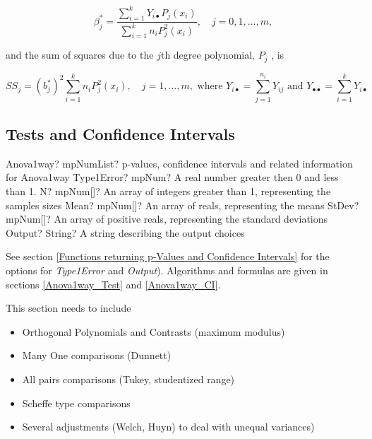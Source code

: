 \begin{equation}
	\beta_j^* = \frac{\sum_{i=1}^k Y_{i\bullet} P_{j}(x_i) }{\sum_{i=1}^k n_i P_{j}^2(x_i) }, \quad j=0,1,\ldots,m, 
\end{equation}

and the sum of squares due to the  $j$th degree polynomial, $P_j$ , is

\begin{equation}
	SS_j = \left(b_j^*\right)^2 \sum_{i=1}^k n_{i} P_j^2(x_i), \quad j=1,\ldots,m, \text{ where } Y_{i\bullet}=\sum_{j=1}^{n_i}Y_{ij} \text{ and } Y_{\bullet\bullet}=\sum_{i=1}^{k}Y_{i\bullet}
\end{equation}




\subsection{Tests and Confidence Intervals}

\begin{mpFunctionsExtract}
	\mpFunctionFiveNotImplemented
	{Anova1way? mpNumList? p-values, confidence intervals and related information for Anova1way}
	{Type1Error? mpNum? A real number greater then 0 and less than 1.}
	{N? mpNum[]? An array of integers greater than 1, representing the samples sizes}
	{Mean? mpNum[]? An array of reals, representing the means}
	{StDev? mpNum[]? An array of positive reals, representing the standard deviations}
	{Output? String? A string describing the output choices}
\end{mpFunctionsExtract}

\vspace{0.3cm}
See section \ref{Functions returning p-Values and Confidence Intervals} for the options for {\itshape\sffamily Type1Error} and {\itshape\sffamily Output}). Algorithms and formulas are given in sections \ref{Anova1way_Test} and \ref{Anova1way_CI}.

This section needs to include
\begin{itemize}		
	\item Orthogonal Polynomials and Contrasts (maximum modulus)
	\item Many One comparisons (Dunnett)
	\item All pairs comparisons (Tukey, studentized range)
	\item Scheffe type comparisons
	\item Several adjustments (Welch, Huyn) to deal with unequal variances)
\end{itemize}




